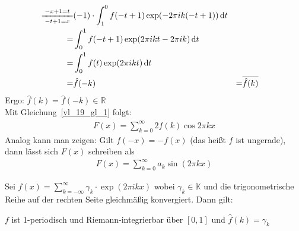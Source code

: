 \begin{Bemerkung}
{\begin{itemize}
\begin{align*}
			 \xlongequal[-t+1=x]{-x+1 = t} &(-1) \cdot \int_1^0 f(-t+1) 
			 	\exp(-2\pi ik (-t+1)) \dd{t} \\
			 = & \int_0^1 f(-t+1)\exp(2\pi i k t - 2\pi ik)  \dd{t} \\
			 = & \int_0^1 f(t) \exp(2\pi ikt) \dd{t} \\
			 = & \hat{f}(-k) &= & \overline{\hat{f}(k)}
		\end{align*}
		Ergo: $\hat{f}(k) = \hat{f}(-k) \in \mathbb{R}$ \\
		Mit Gleichung~\ref{vl_19_gl_1} folgt:
		\begin{align*}
			 F(x) = \sum_{k=0}^{\infty}  2 \hat{f}(k) \cos 2 \pi k x
		\end{align*}
		Analog kann man zeigen: Gilt $f(-x) = - f(x)$ 
		(das heißt $f$ ist ungerade), 
		dann lässt sich $F(x)$ schreiben als
		\begin{align*}
			F(x) = \sum_{k=0}^{\infty}a_k \sin(2\pi k x)
		\end{align*}		 
	\end{itemize}
}\end{Bemerkung}

\begin{Proposition}{%
	Sei $f(x) = \sum_{k = -\infty}^{\infty} \gamma_k \cdot \exp(2\pi i k x)$ wobei 
	$\gamma_k \in \mathbb{K}$ und die trigonometrische Reihe auf der rechten Seite 
	gleichmäßig konvergiert. Dann gilt:
	\begin{center}
		$f$ ist 1-periodisch und Riemann-integrierbar über $[0,1]$ und 
		$\hat{f}(k) = \gamma_k$
	\end{center}
}\end{Proposition}

